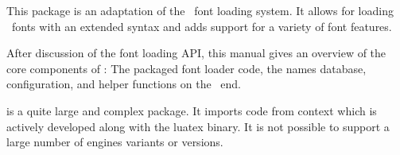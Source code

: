 
\beginfrontmatter


  \typesetdocumenttitle

  \beginabstractcontent
    This package is an adaptation of the \ConTeXt\ font loading system.
    It allows for loading \OpenType\ fonts with an extended syntax and adds
    support for a variety of font features.

    After discussion of the font loading API, this manual gives an
    overview of the core components of : The
    packaged font loader code, the names database, configuration, and
    helper functions on the \Lua\ end.
  \endabstractcontent

\endfrontmatter

\typesetcontent
{}
 is a quite large and complex package. It imports code from context which is actively developed along with the luatex binary. It is not possible
to support a large number of engines variants or versions.

